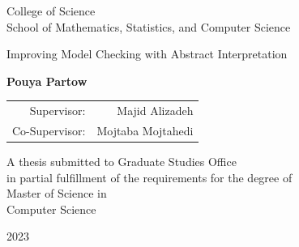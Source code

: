 \documentclass[12pt]{report}
\begin{document}
\begin{latin}
\begin{center}
College of Science\\
School of Mathematics, Statistics, and Computer Science
\end{center}

\begin{center}
\end{center}

\begin{center}
\huge{Improving Model Checking with Abstract Interpretation}
\end{center}

\begin{center}
\end{center}

\begin{center}
\textbf{
Pouya Partow
}
\end{center}

\begin{center}
\begin{tabular}{rr}
Supervisor: & Majid Alizadeh\\
Co-Supervisor: & Mojtaba Mojtahedi\\
\end{tabular}
\end{center}

\vspace{3cm}
\begin{center}
A thesis submitted to Graduate Studies Office\\
in partial fulfillment of the requirements for the degree of \\
Master of Science in\\
Computer Science
\end{center}

\begin{center}
2023
\end{center}


\end{latin}
\end{document}
